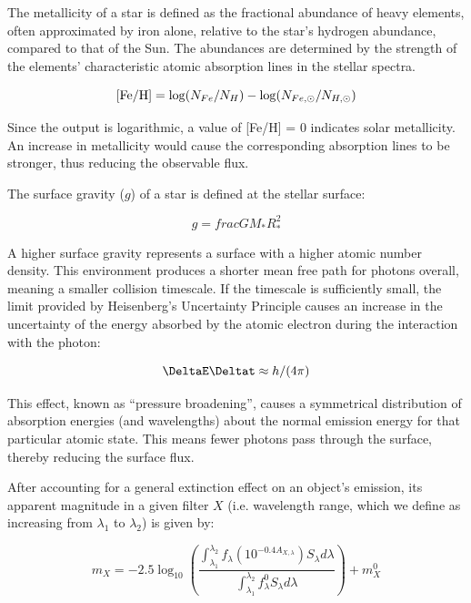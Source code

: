 \documentclass[a4paper, 11pt, oneside]{LJMU_Astro_Thesis}  %
\begin{document}
The metallicity of a star is defined as the fractional abundance of heavy elements, often approximated by iron alone, relative to the star's hydrogen abundance, compared to that of the Sun. The abundances are determined by the strength of the elements' characteristic atomic absorption lines in the stellar spectra.

\begin{equation}
\textnormal{[Fe/H]} = \log(N_{Fe}/N_{H}) - \log(N_{Fe,\odot}/N_{H,\odot})
\label{FeH_def}
\end{equation}

Since the output is logarithmic, a value of [Fe/H] = 0 indicates solar metallicity. An increase in metallicity would cause the corresponding absorption lines to be stronger, thus reducing the observable flux.

The surface gravity ($g$) of a star is defined at the stellar surface:

\begin{equation}
g = frac{GM_{*}}{R_{*}^{2}}
\label{g_def}
\end{equation}

A higher surface gravity represents a surface with a higher atomic number density. This environment produces a shorter mean free path for photons overall, meaning a smaller collision timescale. If the timescale is sufficiently small, the limit provided by Heisenberg's Uncertainty Principle causes an increase in the uncertainty of the energy absorbed by the atomic electron during the interaction with the photon:

\begin{equation}
\DeltaE \Deltat \approx h/(4\pi)
\label{heisenberg}
\end{equation}

This effect, known as ``pressure broadening'', causes a symmetrical distribution of absorption energies (and wavelengths) about the normal emission energy for that particular atomic state. This means fewer photons pass through the surface, thereby reducing the surface flux.

After accounting for a general extinction effect on an object's emission, its apparent magnitude in a given filter $X$ (i.e. wavelength range, which we define as increasing from $\lambda _{1}$ to $\lambda _{2}$) is given by:

\begin{equation}
m_{X} = -2.5 \log_{10} \left(\frac{ \int_{\lambda_{1}}^{\lambda_{2}} f_{\lambda} \left( 10^{-0.4 A_{X,\lambda}} \right) S_{\lambda} d\lambda }{ \int_{\lambda_{1}}^{\lambda_{2}} f_{\lambda}^{0} S_{\lambda} d\lambda }\right) + m_{X}^{0}
\label{app_mag_def}
\end{equation}
\end{document}
